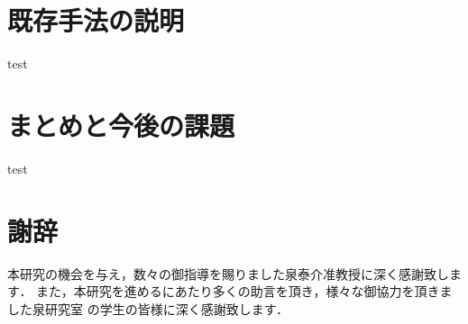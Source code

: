 \documentclass{thesis}
\theoremstyle{definition}
\begin{document}
\chapter{既存手法の説明}
test

\chapter{まとめと今後の課題}
test


\chapter{謝辞}
本研究の機会を与え，数々の御指導を賜りました泉泰介准教授に深く感謝致します．
また，本研究を進めるにあたり多くの助言を頂き，様々な御協力を頂きました泉研究室
の学生の皆様に深く感謝致します．




%
\end{document}
